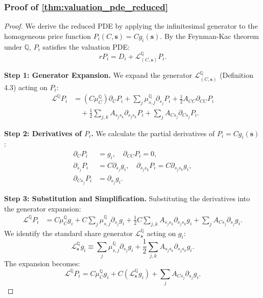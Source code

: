 \documentclass[11pt,letterpaper,oneside]{article}
\numberwithin{equation}{section}
\newcommand{\1}{\mathbf{1}}
\begin{document}
\subsubsection{Proof of \cref{thm:valuation_pde_reduced}}\label{app:proof:thm:valuation_pde_reduced}
\begin{proof}
We derive the reduced PDE by applying the infinitesimal generator to the homogeneous price function $P_i(C,\bm{s}) = C g_i(\bm{s})$. By the Feynman-Kac theorem under $\mathbb{Q}$, $P_i$ satisfies the valuation PDE:
\begin{equation}\label{eq:pde_full}
    r P_i = D_i + \mathcal{L}^{\mathbb{Q}}_{(C,\bm{s})} P_i.
\end{equation}

\textbf{Step 1: Generator Expansion.}
We expand the generator $\mathcal{L}^{\mathbb{Q}}_{(C,\bm{s})}$ (Definition 4.3) acting on $P_i$:
\begin{align}
    \mathcal{L}^{\mathbb{Q}} P_i &= (C\mu_C^{\mathbb{Q}}) \partial_C P_i + \sum_j \mu_{s,j}^{\mathbb{Q}} \partial_{s_j} P_i + \frac12 A_{CC} \partial_{CC} P_i \\
    &\quad + \frac12 \sum_{j,k} A_{s_j s_k} \partial_{s_j s_k} P_i + \sum_j A_{C s_j} \partial_{C s_j} P_i.
\end{align}

\textbf{Step 2: Derivatives of $P_i$.}
We calculate the partial derivatives of $P_i = C g_i(\bm{s})$:
\begin{align}
    \partial_C P_i &= g_i, \quad \partial_{CC} P_i = 0, \\
    \partial_{s_j} P_i &= C \partial_{s_j} g_i, \quad \partial_{s_j s_k} P_i = C \partial_{s_j s_k} g_i, \\
    \partial_{C s_j} P_i &= \partial_{s_j} g_i.
\end{align}

\textbf{Step 3: Substitution and Simplification.}
Substituting the derivatives into the generator expansion:
\begin{align}
    \mathcal{L}^{\mathbb{Q}} P_i &= C\mu_C^{\mathbb{Q}} g_i + C \sum_j \mu_{s,j}^{\mathbb{Q}} \partial_{s_j} g_i + \frac12 C \sum_{j,k} A_{s_j s_k} \partial_{s_j s_k} g_i + \sum_j A_{C s_j} \partial_{s_j} g_i.
\end{align}
We identify the standard share generator $\mathcal{L}^{\mathbb{Q}}_{\bm{s}}$ acting on $g_i$:
\[
    \mathcal{L}^{\mathbb{Q}}_{\bm{s}} g_i \equiv \sum_j \mu_{s,j}^{\mathbb{Q}} \partial_{s_j} g_i + \frac12 \sum_{j,k} A_{s_j s_k} \partial_{s_j s_k} g_i.
\]
The expansion becomes:
\[
    \mathcal{L}^{\mathbb{Q}} P_i = C\mu_C^{\mathbb{Q}} g_i + C (\mathcal{L}^{\mathbb{Q}}_{\bm{s}} g_i) + \sum_j A_{C s_j} \partial_{s_j} g_i.
\]


\end{proof}
\end{document}

